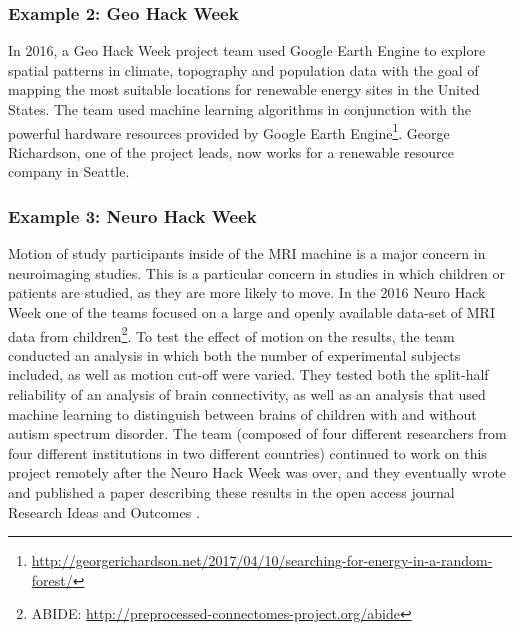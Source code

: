 \subsubsection*{Example 2: Geo Hack Week}
In 2016, a Geo Hack Week project team used Google Earth Engine to explore spatial patterns in climate, topography and population data with the goal of mapping the most suitable locations for renewable energy sites in the United States.
The team used machine learning algorithms in conjunction with the powerful hardware resources provided by Google Earth Engine\footnote{\url{http://georgerichardson.net/2017/04/10/searching-for-energy-in-a-random-forest/}}.
George Richardson, one of the project leads, now works for a renewable resource company in Seattle.
\subsubsection*{Example 3: Neuro Hack Week}
Motion of study participants inside of the MRI machine is a major concern in neuroimaging studies.
This is a particular concern in studies in which children or patients are studied, as they are more likely to move.
In the 2016 Neuro Hack Week one of the teams focused on a large and openly available data-set of MRI data from children\footnote{ABIDE: \url{http://preprocessed-connectomes-project.org/abide}}.
To test the effect of motion on the results, the team conducted an analysis in which both the number of experimental subjects included, as well as motion cut-off were varied.
They tested both the split-half reliability of an analysis of brain connectivity, as well as an analysis that used machine learning to distinguish between brains of children with and without autism spectrum disorder.
The team (composed of four different researchers from four different institutions in two different countries) continued to work on this project remotely after the Neuro Hack Week was over, and they eventually wrote and published a paper describing these results in the open access journal Research Ideas and Outcomes \citep{leonard2017}.
